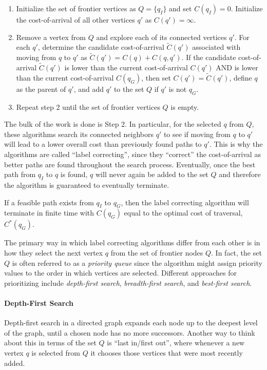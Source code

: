 \begin{enumerate}
    \item Initialize the set of frontier vertices as $Q = \{q_I\}$ and set $C(q_I) = 0$. Initialize the cost-of-arrival of all other vertices $q'$ as $C(q') = \infty$.
    \item Remove a vertex from $Q$ and explore each of its connected vertices $q'$. For each $q'$, determine the candidate cost-of-arrival $\tilde{C}(q')$ associated with moving from $q$ to $q'$ as $\tilde{C}(q') = C(q) + C(q,q')$. If the candidate cost-of-arrival $\tilde{C}(q')$ is lower than the current cost-of-arrival $C(q')$ AND is lower than the current cost-of-arrival $C(q_G)$, then set $C(q') = \tilde{C}(q')$, define $q$ as the parent of $q'$, and add $q'$ to the set $Q$ if $q'$ is not $q_G$.
    \item Repeat step 2 until the set of frontier vertices $Q$ is empty. 
\end{enumerate}

The bulk of the work is done is Step 2. In particular, for the selected $q$ from $Q$, these algorithms search its connected neighbors $q'$ to see if moving from $q$ to $q'$ will lead to a lower overall cost than previously found paths to $q'$. This is why the algorithms are called ``label correcting'', since they ``correct'' the cost-of-arrival as better paths are found throughout the search process. Eventually, once the best path from $q_I$ to $q$ is found, $q$ will never again be added to the set $Q$ and therefore the algorithm is guaranteed to eventually terminate.

\begin{theorem}
If a feasible path exists from $q_I$ to $q_G$, then the label correcting algorithm will terminate in finite time with
$C(q_G)$ equal to the optimal cost of traversal, $C^*(q_G)$.
\end{theorem}

The primary way in which label correcting algorithms differ from each other is in how they select the next vertex $q$ from the set of frontier nodes $Q$. In fact, the set $Q$ is often referred to as a \textit{priority queue} since the algorithm might assign priority values to the order in which vertices are selected. Different approaches for prioritizing include \textit{depth-first search}, \textit{breadth-first search}, and \textit{best-first search}.

\paragraph{Depth-First Search}
Depth-first search in a directed graph expands each node up to the deepest level of the graph, until a chosen node has no more successors. Another way to think about this in terms of the set $Q$ is ``last in/first out'', where whenever a new vertex $q$ is selected from $Q$ it chooses those vertices that were most recently added.

